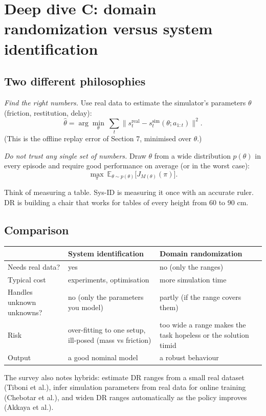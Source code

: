 \documentclass[11pt,a4paper]{article}
\begin{document}
\section{Deep dive C: domain randomization versus system identification}

\subsection{Two different philosophies}
\begin{description}[leftmargin=1.2cm,labelwidth=1cm]
\item[System identification (sys-ID).] \emph{Find the right numbers.} Use real data to estimate the
simulator's parameters $\theta$ (friction, restitution, delay):
\[
\hat\theta=\arg\min_{\theta}\ \sum_{t}\big\|s^{\mathrm{real}}_t-s^{\mathrm{sim}}_t(\theta;a_{1:t})\big\|^2 .
\]
(This is the offline replay error of Section 7, minimised over $\theta$.)
\item[Domain randomization (DR).] \emph{Do not trust any single set of numbers.} Draw $\theta$ from a
wide distribution $p(\theta)$ in every episode and require good performance on average (or in the
worst case):
\[
\max_{\pi}\ \mathbb E_{\theta\sim p(\theta)}\big[J_{M(\theta)}(\pi)\big].
\]
\end{description}
Think of measuring a table. Sys-ID is measuring it once with an accurate ruler. DR is building a
chair that works for tables of every height from $60$ to $90$ cm.

\subsection{Comparison}
\begin{center}
\renewcommand{\arraystretch}{1.25}
\begin{tabularx}{\textwidth}{@{}l X X@{}}
\toprule
 & System identification & Domain randomization \\
\midrule
Needs real data? & yes & no (only the ranges) \\
Typical cost & experiments, optimisation & more simulation time \\
Handles unknown unknowns? & no (only the parameters you model) & partly (if the range covers them) \\
Risk & over-fitting to one setup, ill-posed (mass vs friction) & too wide a range makes the task hopeless or the solution timid \\
Output & a good nominal model & a robust behaviour \\
\bottomrule
\end{tabularx}
\end{center}
The survey also notes hybrids: estimate DR ranges from a small real dataset (Tiboni et al.), infer
simulation parameters from real data for online training (Chebotar et al.), and widen DR ranges
automatically as the policy improves (Akkaya et al.).
\end{document}
